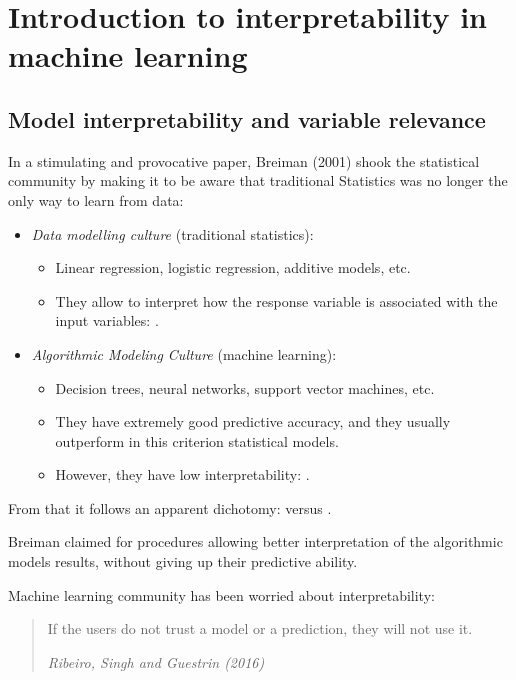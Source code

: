 \chapter{Introduction to interpretability in machine learning}

\section{Model interpretability and variable relevance}

In a stimulating and provocative paper, Breiman (2001)
shook the
statistical community by making it to be aware that traditional
Statistics was no longer the only way to learn from data:
\begin{itemize}
	\item \emph{Data modelling culture} (traditional statistics):
	      \begin{itemize}
		      \item Linear regression, logistic regression, additive models, etc.
		      \item They allow to interpret how the response variable is associated with
		            the input variables: .
	      \end{itemize}
	\item \emph{Algorithmic Modeling Culture} (machine learning):
	      \begin{itemize}
		      \item Decision trees, neural networks, support vector machines, etc.
		      \item They have extremely good predictive accuracy, and they usually outperform
		            in this criterion statistical models.
		      \item However, they have low interpretability: .
	      \end{itemize}
\end{itemize}

From that it follows an apparent dichotomy:  versus .

Breiman claimed for procedures allowing better interpretation of the algorithmic models
results, without giving up their predictive ability.

Machine learning community has been worried about interpretability:
\begin{quote}
	If the users do not trust a model or a prediction, they will not use it.

	\emph{Ribeiro, Singh and Guestrin (2016)}
\end{quote}

